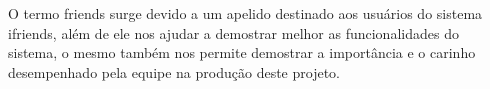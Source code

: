 O termo \glspl{friend} surge devido a um apelido destinado aos usuários do sistema \gls{ifriends}, além de ele nos ajudar a demostrar melhor as funcionalidades do sistema, o mesmo também nos permite demostrar a importância e o carinho desempenhado pela equipe na produção deste projeto.  












